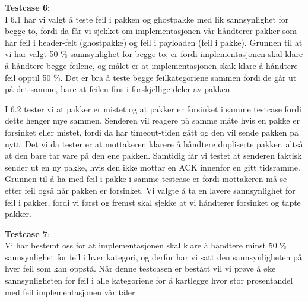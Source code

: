 \textbf{Testcase 6}:\\
I 6.1 har vi valgt å teste feil i pakken og ghostpakke med lik sannsynlighet for begge to, fordi da får vi sjekket om implementasjonen vår håndterer pakker som har feil i header-felt (ghostpakke) og feil i payloaden (feil i pakke). Grunnen til at vi har valgt 50 \% sannsynlighet for begge to, er fordi implementasjonen skal klare å håndtere begge feilene, og målet er at implementasjonen skak klare å håndtere feil opptil 50 \%. Det er bra å teste begge feilkategoriene sammen fordi de går ut på det samme, bare at feilen fins i forskjellige deler av pakken. 

I 6.2 tester vi at pakker er mistet og at pakker er forsinket i samme testcase fordi dette henger mye sammen. Senderen vil reagere på samme måte hvis en pakke er forsinket eller mistet, fordi da har timeout-tiden gått og den vil sende pakken på nytt. Det vi da tester er at mottakeren klarere å håndtere dupliserte pakker, altså at den bare tar vare på den ene pakken. Samtidig får vi testet at senderen faktisk sender ut en ny pakke, hvis den ikke mottar en ACK innenfor en gitt tidsramme. Grunnen til å ha med feil i pakke i samme testcase er fordi mottakeren må se etter feil også når pakken er forsinket. Vi valgte å ta en lavere sannsynlighet for feil i pakker, fordi vi først og fremst skal sjekke at vi håndterer forsinket og tapte pakker.

\textbf{Testcase 7}:\\
Vi har bestemt oss for at implementasjonen skal klare å håndtere minst 50 \% sannsynlighet for feil i hver kategori, og derfor har vi satt den sannsynligheten på hver feil som kan oppstå. Når denne testcasen er bestått vil vi prøve å øke sannsynligheten for feil i alle kategoriene for å kartlegge hvor stor prosentandel med feil implementasjonen vår tåler. 